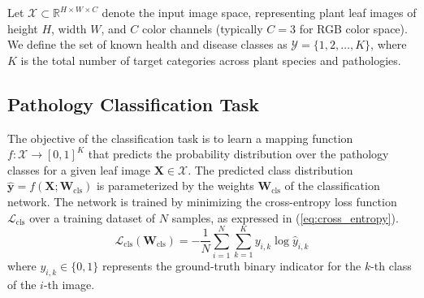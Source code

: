 \documentclass[10pt, conference]{IEEEtran}
\begin{document}
Let $\mathcal{X} \subset \mathbb{R}^{H \times W \times C}$ denote the input image space, representing plant leaf images of height $H$, width $W$, and $C$ color channels (typically $C=3$ for RGB color space). We define the set of known health and disease classes as $\mathcal{Y} = \{1, 2, \dots, K\}$, where $K$ is the total number of target categories across plant species and pathologies.

\subsection{Pathology Classification Task}
The objective of the classification task is to learn a mapping function $f: \mathcal{X} \to [0, 1]^K$ that predicts the probability distribution over the pathology classes for a given leaf image $\mathbf{X} \in \mathcal{X}$. The predicted class distribution $\mathbf{\hat{y}} = f(\mathbf{X}; \mathbf{W}_{\text{cls}})$ is parameterized by the weights $\mathbf{W}_{\text{cls}}$ of the classification network. The network is trained by minimizing the cross-entropy loss function $\mathcal{L}_{\text{cls}}$ over a training dataset of $N$ samples, as expressed in (\ref{eq:cross_entropy}).
\begin{equation}
    \label{eq:cross_entropy}
    \mathcal{L}_{\text{cls}}(\mathbf{W}_{\text{cls}}) = -\frac{1}{N} \sum_{i=1}^{N} \sum_{k=1}^{K} y_{i,k} \log \hat{y}_{i,k}
\end{equation}
where $y_{i,k} \in \{0, 1\}$ represents the ground-truth binary indicator for the $k$-th class of the $i$-th image.
\end{document}

